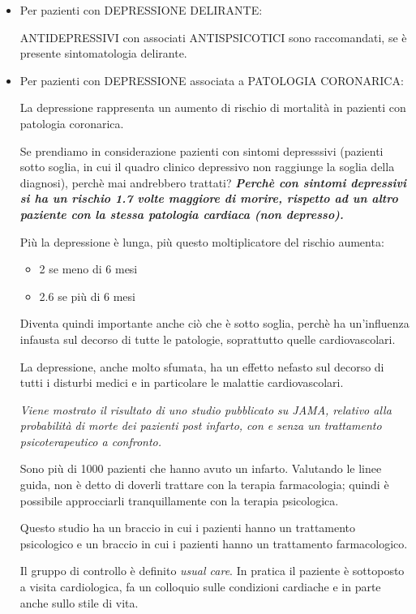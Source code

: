 \begin{itemize}
\begin{itemize}
\item
  Per pazienti con DEPRESSIONE DELIRANTE:

  ANTIDEPRESSIVI con associati ANTISPSICOTICI sono raccomandati, se è
  presente sintomatologia delirante.


\item
  Per pazienti con DEPRESSIONE associata a PATOLOGIA CORONARICA:

  La depressione rappresenta un aumento di rischio di mortalità in
  pazienti con patologia coronarica.

  Se prendiamo in considerazione pazienti con sintomi depresssivi
  (pazienti sotto soglia, in cui il quadro clinico depressivo non
  raggiunge la soglia della diagnosi), perchè mai andrebbero trattati?
  \textbf{\emph{Perchè con sintomi depressivi si ha un rischio 1.7 volte
  maggiore di morire, rispetto ad un altro paziente con la stessa
  patologia cardiaca (non depresso).}}

  Più la depressione è lunga, più questo moltiplicatore del rischio
  aumenta:
\begin{itemize}
\item
  2 se meno di 6 mesi
\item
2.6 se più di 6 mesi
\end{itemize}

Diventa quindi importante anche ciò che è sotto soglia, perchè ha
un'influenza infausta sul decorso di tutte le patologie, soprattutto
quelle cardiovascolari.

La depressione, anche molto sfumata, ha un effetto nefasto sul decorso
di tutti i disturbi medici e in particolare le malattie cardiovascolari.

\emph{Viene mostrato il risultato di uno studio pubblicato su JAMA,
relativo alla probabilità di morte dei pazienti post infarto, con e
senza un trattamento psicoterapeutico a confronto.}

Sono più di 1000 pazienti che hanno avuto un infarto. Valutando le linee
guida, non è detto di doverli trattare con la terapia farmacologia;
quindi è possibile approcciarli tranquillamente con la terapia
psicologica.

Questo studio ha un braccio in cui i pazienti hanno un trattamento
psicologico e un braccio in cui i pazienti hanno un trattamento
farmacologico.

Il gruppo di controllo è definito \emph{usual care}. In pratica il
paziente è sottoposto a visita cardiologica, fa un colloquio sulle
condizioni cardiache e in parte anche sullo stile di vita.


\end{itemize}
\end{itemize}
